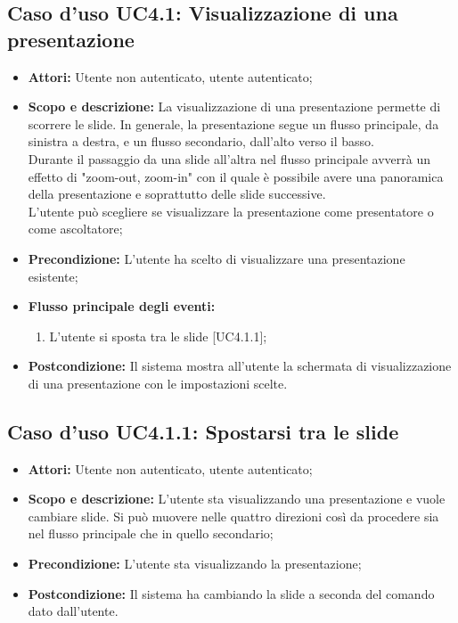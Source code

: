 \subsection{Caso d'uso UC4.1: Visualizzazione di una presentazione}
\begin{itemize}
	\item \textbf{Attori:} Utente non autenticato, utente autenticato;
	\item \textbf{Scopo e descrizione:} La visualizzazione di una presentazione permette di scorrere le \gls{slide}. In generale, la presentazione segue un flusso principale, da sinistra a destra, e un flusso secondario, dall'alto verso il basso.\\
	Durante il passaggio da una \gls{slide} all'altra nel flusso principale avverrà un effetto di "zoom-out, zoom-in" con il quale è possibile avere una panoramica della presentazione e soprattutto delle \gls{slide} successive.\\
	L'utente può scegliere se visualizzare la presentazione come presentatore o come ascoltatore;
	\item \textbf{Precondizione:} L'utente ha scelto di visualizzare una presentazione esistente;
	\item \textbf{Flusso principale degli eventi:}
	\begin{enumerate}
		\item L'utente si sposta tra le \gls{slide} [UC4.1.1];
	\end{enumerate}
	\item \textbf{Postcondizione:} Il sistema mostra all'utente la schermata di visualizzazione di una presentazione con le impostazioni scelte.
\end{itemize}

\subsection{Caso d'uso UC4.1.1: Spostarsi tra le slide}
\begin{itemize}
	\item \textbf{Attori:} Utente non autenticato, utente autenticato;
	\item \textbf{Scopo e descrizione:} L'utente sta visualizzando una presentazione e vuole cambiare \gls{slide}. Si può muovere nelle quattro direzioni così da procedere sia nel flusso principale che in quello secondario;
	\item \textbf{Precondizione:} L'utente sta visualizzando la presentazione;
	\item \textbf{Postcondizione:} Il sistema ha cambiando la \gls{slide} a seconda del comando dato dall'utente.
\end{itemize}


